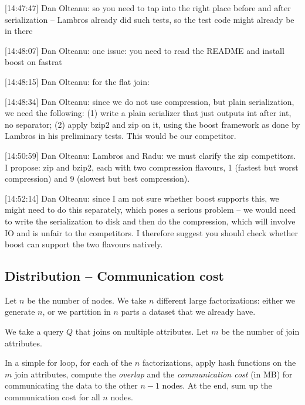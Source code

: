 [14:47:47] Dan Olteanu: so you need to tap into the right place before and after serialization -- Lambros already did such tests, so the test code might already be in there

[14:48:07] Dan Olteanu: one issue: you need to read the README and install boost on fastrat

[14:48:15] Dan Olteanu: for the flat join:

[14:48:34] Dan Olteanu: since we do not use compression, but plain serialization, we need the following: (1) write a plain serializer that just outputs int after int, no separator; (2) apply bzip2 and zip on it, using the boost framework as done by Lambros in his preliminary tests. This would be our competitor.

[14:50:59] Dan Olteanu: Lambros and Radu: we must clarify the zip competitors. I propose: zip and bzip2, each with two compression flavours, 1 (fastest but worst compression) and 9 (slowest but best compression).

[14:52:14] Dan Olteanu: since I am not sure whether boost supports this, we might need to do this separately, which poses a serious problem -- we would need to write the serialization to disk and then do the compression, which will involve IO and is unfair to the competitors. I therefore suggest you should check whether boost can support the two flavours natively.


\subsection{Distribution -- Communication cost}\label{sec:experiments:communication:cost}
\todo{}
Let $n$ be the number of nodes. 
We take $n$ different large factorizations: either we generate $n$, or we partition in $n$ parts a dataset that we already have.

We take a query $Q$ that joins on multiple attributes. 
Let $m$ be the number of join attributes.

In a simple for loop, for each of the $n$ factorizations, apply hash functions on the $m$ join attributes, compute the {\em overlap} and the {\em communication cost} (in MB) for communicating the data to the other $n-1$ nodes.
At the end, sum up the communication cost for all $n$ nodes.

\medskip

